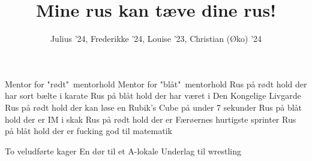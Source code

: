 \documentclass[a4paper,11pt]{article}
\title{Mine rus kan tæve dine rus!}
\author{Julius '24, Frederikke '24, Louise '23, Christian (Øko) '24}
\begin{document}
\maketitle

\begin{roles}
 Mentor for "rødt"\ mentorhold
 Mentor for "blåt"\ mentorhold
 Rus på rødt hold der har sort bælte i karate
 Rus på blåt hold der har været i Den Kongelige Livgarde
 Rus på rødt hold der kan løse en Rubik's Cube på under 7 sekunder
 Rus på blåt hold der er IM i skak
 Rus på rødt hold der er Færøernes hurtigste sprinter
 Rus på blåt hold der er fucking god til matematik
\end{roles}

\begin{props}
 To veludførte kager
 En dør til et A-lokale
 Underlag til wrestling
\end{props}
\end{document}
